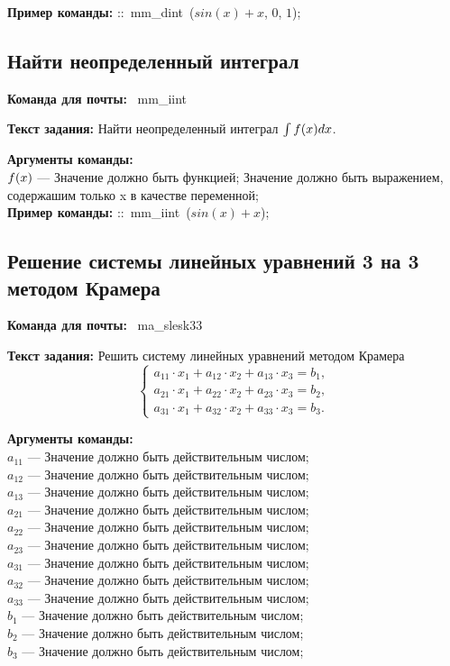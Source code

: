 \noindent \textbf{Пример команды:} ::\mbox{ mm\_dint }($sin(x)+x$, $0$, $1$);

\subsection{Найти неопределенный интеграл}

\noindent \textbf{Команда для почты:} \mbox{ mm\_iint }

\noindent \textbf{Текст задания:} Найти неопределенный интеграл $\int f(x)dx$.

\noindent \textbf{Аргументы команды:}\\ $f(x)$ ---  Значение должно быть функцией; Значение должно быть выражением, содержашим только x в качестве переменной;\\
 

\noindent \textbf{Пример команды:} ::\mbox{ mm\_iint }($sin(x)+x$);

\subsection{Решение системы линейных уравнений 3 на 3 методом Крамера}

\noindent \textbf{Команда для почты:} \mbox{ ma\_slesk33 }

\noindent \textbf{Текст задания:} Решить систему линейных уравнений методом Крамера $$\left\{\begin{array}{l}a_{11}\cdot x_{1}+a_{12}\cdot x_{2}+a_{13}\cdot x_{3}=b_{1},\\a_{21}\cdot x_{1}+a_{22}\cdot x_{2}+a_{23}\cdot x_{3}=b_2,\\a_{31}\cdot x_{1}+a_{32}\cdot x_{2}+a_{33}\cdot x_{3}=b_{3}.\end{array}\right.$$

\noindent \textbf{Аргументы команды:}\\ $a_{11}$ ---  Значение должно быть действительным числом;\\
$a_{12}$ ---  Значение должно быть действительным числом;\\
$a_{13}$ ---  Значение должно быть действительным числом;\\
$a_{21}$ ---  Значение должно быть действительным числом;\\
$a_{22}$ ---  Значение должно быть действительным числом;\\
$a_{23}$ ---  Значение должно быть действительным числом;\\
$a_{31}$ ---  Значение должно быть действительным числом;\\
$a_{32}$ ---  Значение должно быть действительным числом;\\
$a_{33}$ ---  Значение должно быть действительным числом;\\
$b_{1}$ ---  Значение должно быть действительным числом;\\
$b_{2}$ ---  Значение должно быть действительным числом;\\
$b_{3}$ ---  Значение должно быть действительным числом;\\
 

